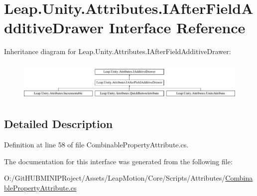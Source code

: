 \hypertarget{interface_leap_1_1_unity_1_1_attributes_1_1_i_after_field_additive_drawer}{}\section{Leap.\+Unity.\+Attributes.\+I\+After\+Field\+Additive\+Drawer Interface Reference}
\label{interface_leap_1_1_unity_1_1_attributes_1_1_i_after_field_additive_drawer}
Inheritance diagram for Leap.\+Unity.\+Attributes.\+I\+After\+Field\+Additive\+Drawer\+:\begin{figure}[H]
\begin{center}
\leavevmode
\includegraphics[height=1.944444cm]{interface_leap_1_1_unity_1_1_attributes_1_1_i_after_field_additive_drawer}
\end{center}
\end{figure}


\subsection{Detailed Description}


Definition at line 58 of file Combinable\+Property\+Attribute.\+cs.



The documentation for this interface was generated from the following file\+:\begin{DoxyCompactItemize}
\item 
O\+:/\+Git\+H\+U\+B\+M\+I\+N\+I\+P\+Roject/\+Assets/\+Leap\+Motion/\+Core/\+Scripts/\+Attributes/\mbox{\hyperlink{_combinable_property_attribute_8cs}{Combinable\+Property\+Attribute.\+cs}}\end{DoxyCompactItemize}
